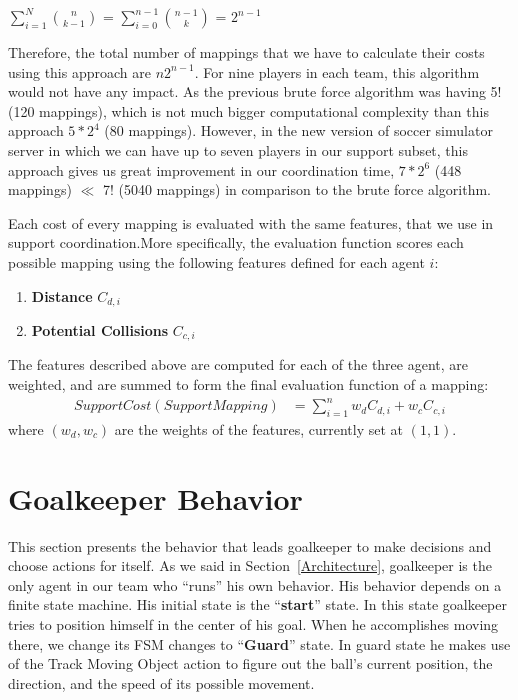 \begin{center}
$\sum\limits_{i=1}^N{{n}\choose{k-1}}$ = $\sum\limits_{i=0}^{n-1}{{n-1}\choose{k}}$ = $2^{n-1}$
\end{center}
Therefore, the total number of mappings that we have to calculate their costs using this approach are $n2^{n-1}$. For nine players in each team, this algorithm would not have any impact. As the previous brute force algorithm was having 5! (120 mappings), which is not much bigger computational complexity than this approach $5 \ast 2^{4}$ (80 mappings). However, in the new version of soccer simulator server in which we can have up to seven players in our support subset, this approach gives us great improvement in our coordination time, $7 \ast 2^{6}$ (448 mappings) $\ll$ 7! (5040 mappings) in comparison to the brute force algorithm.

Each cost of every mapping is evaluated with the same features, that we use in support coordination.More specifically, the evaluation function scores each possible mapping using the following features defined for each agent $i$: 
\begin{enumerate}
\item \textbf{Distance} $C_{d,i}$
\item \textbf{Potential Collisions} $C_{c,i}$
\end{enumerate}
The features described above are computed for each of the three agent, are weighted, and are summed to form the final evaluation function of a mapping: 
\begin{align*}
SupportCost(SupportMapping) &= \sum_{i=1}^n w_dC_{d,i}+w_cC_{c,i}
\end{align*}
where $(w_d,w_c)$ are the weights of the features, currently set at $(1,1)$.








\section{Goalkeeper Behavior}
\label{GoalKeeper}

This section presents the behavior that leads goalkeeper to make decisions and choose actions for itself. As we said in Section~\ref{Architecture}, goalkeeper is the only agent in our team who ``runs'' his own behavior. His behavior depends on a finite state machine. His initial state is the ``\textbf{start}'' state. In this state goalkeeper tries to position himself in the center of his goal. When he accomplishes moving there, we change its FSM changes to ``\textbf{Guard}'' state. In guard state he makes use of the Track Moving Object action to figure out the ball's current position, the direction, and the speed of its possible movement.


